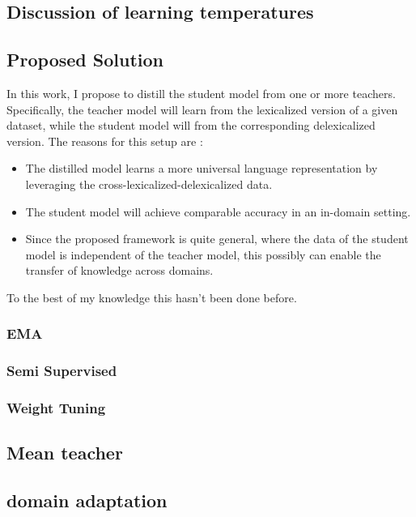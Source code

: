 \documentclass[compsoc,onecolumn]{IEEEtran}
\begin{document}
\subsection{Discussion of learning temperatures}

\subsection{Proposed Solution}

In this work, I propose to distill the student model from one or more teachers. Specifically, the teacher model will learn from the lexicalized version of a given dataset, while the student model will from the corresponding delexicalized version. 
The reasons for this setup are :

\begin{itemize}
  \item The distilled model learns a more universal language representation by leveraging the cross-lexicalized-delexicalized data.
  \item The student model will achieve comparable accuracy in an in-domain setting.
  \item Since the proposed framework is quite general, where the data of the student model is independent of the teacher model, this possibly can enable the transfer of knowledge across domains.
\end{itemize}



To the best of my knowledge this hasn't been done before.

\subsubsection{EMA}
\subsubsection{Semi Supervised}
\subsubsection{Weight Tuning}





\subsection{Mean teacher}

\subsection{domain adaptation }
\end{document}
